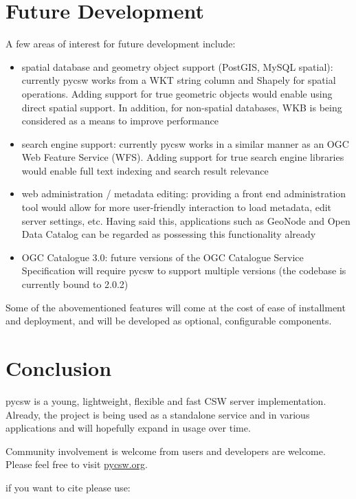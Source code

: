\section{Future Development}
\label{sec:futuredevelopment}

A few areas of interest for future development include:

\begin{itemize}
\item spatial database and geometry object support (PostGIS, MySQL spatial): currently pycsw works from a WKT string column and Shapely for spatial operations.  Adding support for true geometric objects would enable using direct spatial support.  In addition, for non-spatial databases, WKB is being considered as a means to improve performance
\item search engine support: currently pycsw works in a similar manner as an OGC Web Feature Service (WFS).  Adding support for true search engine libraries would enable full text indexing and search result relevance
\item web administration / metadata editing: providing a front end administration tool would allow for more user-friendly interaction to load metadata, edit server settings, etc.  Having said this, applications such as GeoNode and Open Data Catalog can be regarded as possessing this functionality already
\item OGC Catalogue 3.0: future versions of the OGC Catalogue Service Specification will require pycsw to support multiple versions (the codebase is currently bound to 2.0.2)
\end{itemize}

Some of the abovementioned features will come at the cost of ease of installment and deployment, and will be developed as optional, configurable components.

\section{Conclusion}
\label{sec:conclusion}

pycsw is a young, lightweight, flexible and fast CSW server implementation.  Already, the project is being used as a standalone service and in various applications and will hopefully expand in usage over time.

Community involvement is welcome from users and developers are welcome.  Please feel free to visit \url{pycsw.org}.

if you want to cite please use:

